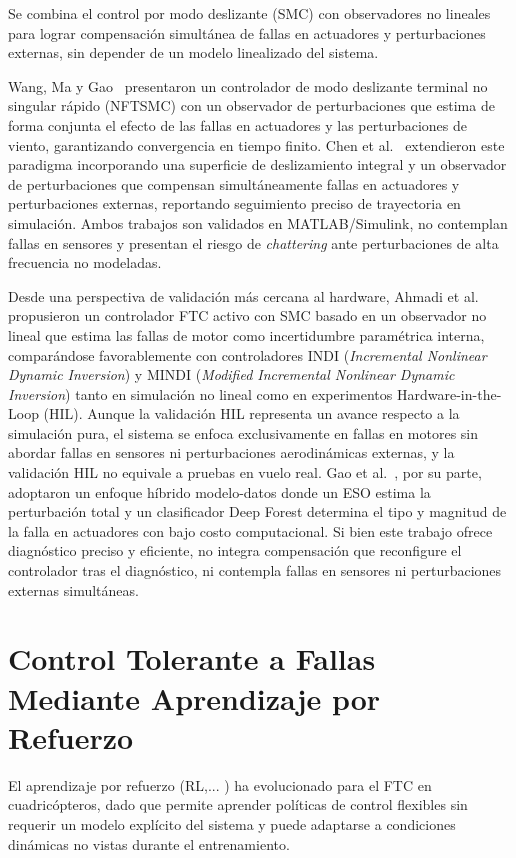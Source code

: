 \noindent Se combina el control por modo deslizante (SMC) con observadores no lineales para lograr compensación simultánea de fallas en actuadores y perturbaciones externas, sin depender de un modelo linealizado del sistema.

Wang, Ma y Gao~\cite{wang2022} presentaron un controlador de modo deslizante terminal no singular rápido (NFTSMC) con un observador de perturbaciones que estima de forma conjunta el efecto de las fallas en actuadores y las perturbaciones de viento, garantizando convergencia en tiempo finito. Chen et al.~\cite{chen2023} extendieron este paradigma incorporando una superficie de deslizamiento integral y un observador de perturbaciones que compensan simultáneamente fallas en actuadores y perturbaciones externas, reportando seguimiento preciso de trayectoria en simulación. Ambos trabajos son validados en MATLAB/Simulink, no contemplan fallas en sensores y presentan el riesgo de \textit{chattering} ante perturbaciones de alta frecuencia no modeladas.

Desde una perspectiva de validación más cercana al hardware, Ahmadi et al.~\cite{ahmadi2023} propusieron un controlador FTC activo con SMC basado en un observador no lineal que estima las fallas de motor como incertidumbre paramétrica interna, comparándose favorablemente con controladores INDI (\textit{Incremental Nonlinear Dynamic Inversion}) y MINDI (\textit{Modified Incremental Nonlinear Dynamic Inversion}) tanto en simulación no lineal como en experimentos Hardware-in-the-Loop (HIL). Aunque la validación HIL representa un avance respecto a la simulación pura, el sistema se enfoca exclusivamente en fallas en motores sin abordar fallas en sensores ni perturbaciones aerodinámicas externas, y la validación HIL no equivale a pruebas en vuelo real. Gao et al.~\cite{gao2022}, por su parte, adoptaron un enfoque híbrido modelo-datos donde un ESO estima la perturbación total y un clasificador Deep Forest determina el tipo y magnitud de la falla en actuadores con bajo costo computacional. Si bien este trabajo ofrece diagnóstico preciso y eficiente, no integra compensación que reconfigure el controlador tras el diagnóstico, ni contempla fallas en sensores ni perturbaciones externas simultáneas.


\section{Control Tolerante a Fallas Mediante Aprendizaje por Refuerzo}


El aprendizaje por refuerzo (RL,... ) ha evolucionado para el FTC en cuadricópteros, dado que permite aprender políticas de control flexibles sin requerir un modelo explícito del sistema y puede adaptarse a condiciones dinámicas no vistas durante el entrenamiento.


